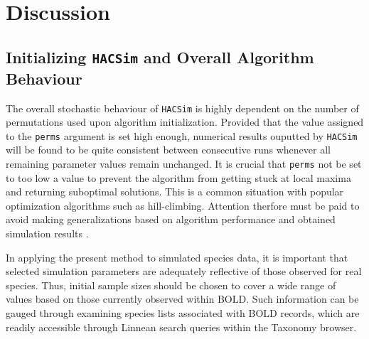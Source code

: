 \section{Discussion}

\subsection{Initializing {\tt HACSim} and Overall Algorithm Behaviour}

The overall stochastic behaviour of {\tt HACSim} is highly dependent on the number of \\ permutations used upon algorithm initialization. Provided that the value assigned to the {\tt  perms} argument is set high enough, numerical results ouputted by {\tt HACSim} will be found to be quite consistent between consecutive runs whenever all remaining parameter values remain unchanged. It is crucial that {\tt perms} not be set to too low a value to prevent the algorithm from getting stuck at local maxima and returning suboptimal solutions. This is a common situation with popular optimization algorithms such as hill-climbing. Attention therfore must be paid to avoid making generalizations based on algorithm performance and obtained simulation results \cite{spall2012stochastic}.



In applying the present method to simulated species data, it is important that selected simulation parameters are adequately reflective of those observed for real species. Thus, initial sample sizes should be chosen to cover a wide range of values based on those currently observed within BOLD. Such information can be gauged through examining species lists associated with BOLD records, which are readily accessible through Linnean search queries within the Taxonomy browser.



